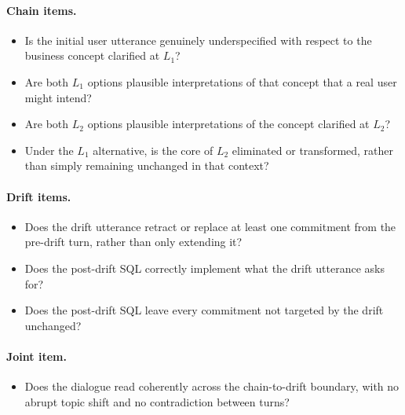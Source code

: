 \paragraph{Chain items.}

\begin{itemize}[
  topsep=0.15em,
  itemsep=0.05em,
  parsep=0pt,
  partopsep=0pt
]
\item[\textbf{1.}] Is the initial user utterance genuinely underspecified with respect to the business concept clarified at $L_1$?
\item[\textbf{2.}] Are both $L_1$ options plausible interpretations of that concept that a real user might intend?
\item[\textbf{3.}] Are both $L_2$ options plausible interpretations of the concept clarified at $L_2$?
\item[\textbf{4.}] Under the $L_1$ alternative, is the core of $L_2$ eliminated or transformed, rather than simply remaining unchanged in that context?
\end{itemize}

\vspace{-0.6mm}

\paragraph{Drift items.}
\begin{itemize}[
  topsep=0.15em,
  itemsep=0.05em,
  parsep=0pt,
  partopsep=0pt
]
\item[\textbf{1.}] Does the drift utterance retract or replace at least one commitment from the pre-drift turn, rather than only extending it?
\item[\textbf{2.}] Does the post-drift SQL correctly implement what the drift utterance asks for?
\item[\textbf{3.}] Does the post-drift SQL leave every commitment not targeted by the drift unchanged?
\end{itemize}

\vspace{-0.6mm}

\paragraph{Joint item.}
\begin{itemize}[
  topsep=0.15em,
  itemsep=0.05em,
  parsep=0pt,
  partopsep=0pt
]
\item[\textbf{1.}] Does the dialogue read coherently across the chain-to-drift boundary, with no abrupt topic shift and no contradiction between turns?
\end{itemize}

